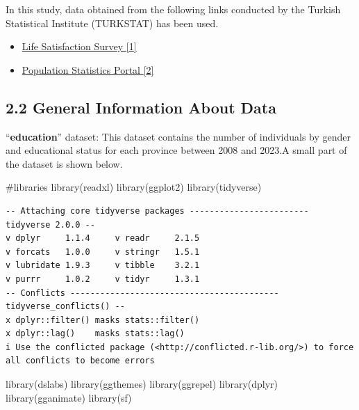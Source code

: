 \documentclass[
  11pt,
  a4paper,
  DIV=11,
  numbers=noendperiod]{scrartcl}
\newenvironment{Shaded}{\begin{snugshade}}{\end{snugshade}}
\newcommand{\CommentTok}[1]{\textcolor[rgb]{0.37,0.37,0.37}{#1}}
\newcommand{\FunctionTok}[1]{\textcolor[rgb]{0.28,0.35,0.67}{#1}}
\newcommand{\NormalTok}[1]{\textcolor[rgb]{0.00,0.23,0.31}{#1}}
\begin{document}
In this study, data obtained from the following links conducted by the
Turkish Statistical Institute (TURKSTAT) has been used.

\begin{itemize}
\item
  \href{https://www.tuik.gov.tr/}{Life Satisfaction Survey {[}1{]}}
\item
  \href{https://nip.tuik.gov.tr/}{Population Statistics Portal {[}2{]}}
\end{itemize}

\subsection{2.2 General Information About
Data}\label{general-information-about-data}

{``\textbf{education}''} dataset: This dataset contains the number of
individuals by gender and educational status for each province between
2008 and 2023.A small part of the dataset is shown below.

\begin{Shaded}
\begin{Highlighting}[]
\CommentTok{\#libraries}
\FunctionTok{library}\NormalTok{(readxl)}
\FunctionTok{library}\NormalTok{(ggplot2)}
\FunctionTok{library}\NormalTok{(tidyverse)}
\end{Highlighting}
\end{Shaded}

\begin{verbatim}
-- Attaching core tidyverse packages ------------------------ tidyverse 2.0.0 --
v dplyr     1.1.4     v readr     2.1.5
v forcats   1.0.0     v stringr   1.5.1
v lubridate 1.9.3     v tibble    3.2.1
v purrr     1.0.2     v tidyr     1.3.1
-- Conflicts ------------------------------------------ tidyverse_conflicts() --
x dplyr::filter() masks stats::filter()
x dplyr::lag()    masks stats::lag()
i Use the conflicted package (<http://conflicted.r-lib.org/>) to force all conflicts to become errors
\end{verbatim}

\begin{Shaded}
\begin{Highlighting}[]
\FunctionTok{library}\NormalTok{(dslabs)}
\FunctionTok{library}\NormalTok{(ggthemes)}
\FunctionTok{library}\NormalTok{(ggrepel)}
\FunctionTok{library}\NormalTok{(dplyr)}
\FunctionTok{library}\NormalTok{(gganimate)}
\FunctionTok{library}\NormalTok{(sf)}
\end{Highlighting}
\end{Shaded}
\end{document}

